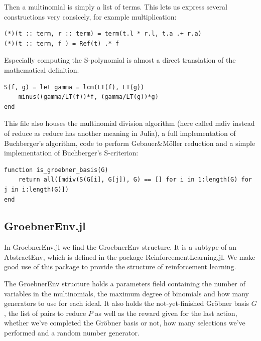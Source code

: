 \documentclass{article}
\theoremstyle{changedot}
\theoremstyle{changedotbreak}
\theoremstyle{nonumberplain}
\begin{document}
Then a multinomial is simply a list of terms. This lets us express several constructions very consicely, for example multiplication:
\begin{verbatim}
(*)(t :: term, r :: term) = term(t.l * r.l, t.a .+ r.a)
(*)(t :: term, f ) = Ref(t) .* f
\end{verbatim}

Especially computing the S-polynomial is almost a direct translation of the mathematical definition.
\begin{verbatim}
S(f, g) = let gamma = lcm(LT(f), LT(g))
    minus((gamma/LT(f))*f, (gamma/LT(g))*g)
end
\end{verbatim}

This file also houses the multinomial division algorithm (here called mdiv instead of reduce as reduce has another meaning in Julia), a full implementation of Buchberger's algorithm, code to perform Gebauer\&Möller reduction and a simple implementation of Buchberger's S-criterion:

\begin{verbatim}
function is_groebner_basis(G)
    return all([mdiv(S(G[i], G[j]), G) == [] for i in 1:length(G) for j in i:length(G)])
end
\end{verbatim}


\subsection{GroebnerEnv.jl}
In GroebnerEnv.jl we find the GroebnerEnv structure. It is a subtype of an AbstractEnv, which is defined in the package ReinforcementLearning.jl. We make good use of this package to provide the structure of reinforcement learning.

The GroebnerEnv structure holds a parameters field containing the number of variables in the multinomials, the maximum degree of binomials and how many generators to use for each ideal. It also holds the not-yet-finished Gröbner basis $G$, the list of pairs to reduce $P$ as well as the reward given for the last action, whether we've completed the Gröbner basis or not, how many selections we've performed and a random number generator.
\end{document}
